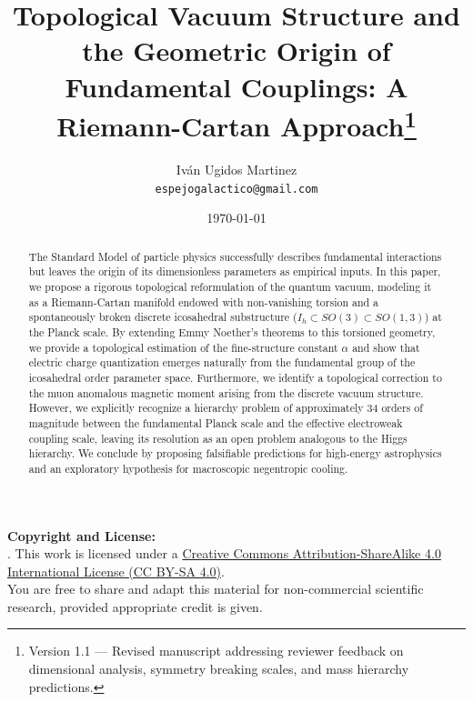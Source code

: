 \documentclass[a4paper,12pt]{article}
\theoremstyle{definition}
\theoremstyle{plain}
\theoremstyle{remark}
\begin{document}

\title{\textbf{Topological Vacuum Structure and the Geometric Origin of Fundamental Couplings: A Riemann-Cartan Approach}\thanks{Version 1.1 --- Revised manuscript addressing reviewer feedback on dimensional analysis, symmetry breaking scales, and mass hierarchy predictions.}}
\author{Iván Ugidos Martinez \\ \small \texttt{espejogalactico@gmail.com}}
\date{\today}

\maketitle
\vspace{1cm}
\noindent \textbf{Copyright and License:} \\
\noindent \textcopyright {}. This work is licensed under a \href{https://creativecommons.org/licenses/by-sa/4.0/}{Creative Commons Attribution-ShareAlike 4.0 International License (CC BY-SA 4.0)}. \\
\noindent You are free to share and adapt this material for non-commercial scientific research, provided appropriate credit is given.

\begin{abstract}
The Standard Model of particle physics successfully describes fundamental interactions but leaves the origin of its dimensionless parameters as empirical inputs. In this paper, we propose a rigorous topological reformulation of the quantum vacuum, modeling it as a Riemann-Cartan manifold endowed with non-vanishing torsion and a spontaneously broken discrete icosahedral substructure ($I_h \subset SO(3) \subset SO(1,3)$) at the Planck scale. By extending Emmy Noether’s theorems to this torsioned geometry, we provide a topological estimation of the fine-structure constant $\alpha$ and show that electric charge quantization emerges naturally from the fundamental group of the icosahedral order parameter space. Furthermore, we identify a topological correction to the muon anomalous magnetic moment arising from the discrete vacuum structure. However, we explicitly recognize a hierarchy problem of approximately 34 orders of magnitude between the fundamental Planck scale and the effective electroweak coupling scale, leaving its resolution as an open problem analogous to the Higgs hierarchy. We conclude by proposing falsifiable predictions for high-energy astrophysics and an exploratory hypothesis for macroscopic negentropic cooling.
\end{abstract}
\end{document}
